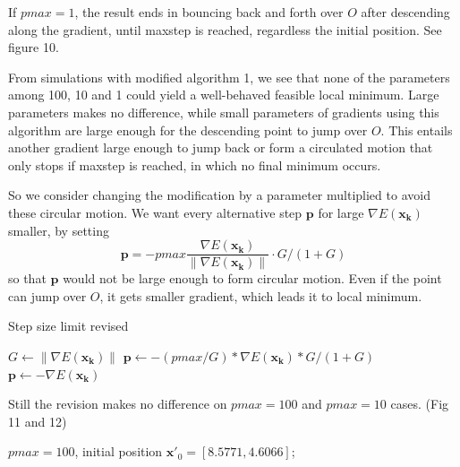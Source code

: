 \documentclass{article}
\begin{document}
If $pmax=1$, the result ends in bouncing back and forth over $O$ after descending along the gradient, until maxstep is reached, regardless the initial position. See figure 10.

\vspace{3mm}
From simulations with modified algorithm 1, we see that none of the parameters among 100, 10 and 1 could yield a well-behaved feasible local minimum. Large parameters makes no difference, while small parameters of gradients using this algorithm are large enough for the descending point to jump over $O$. This entails another gradient large enough to jump back or form a circulated motion that only stops if maxstep is reached, in which no final minimum occurs. 

So we consider changing the modification by a parameter multiplied to avoid these circular motion. We want every alternative step $\mathbf{p}$ for large $\nabla E(\mathbf{x_k})$ smaller, by setting 
$$\mathbf{p} = -pmax\frac{\nabla E(\mathbf{x_k})}{\|\nabla E(\mathbf{x_k})\|}\cdot G/(1+G)$$
so that $\mathbf{p}$ would not be large enough to form circular motion. Even if the point can jump over $O$, it gets smaller gradient, which leads it to local minimum.
\begin{algorithm}
\caption{Step size limit revised}\label{euclid}
\begin{algorithmic}[2]
\State $G \gets \|{\nabla E(\mathbf{x_k})}\| $
\State $\mathbf{p} \gets -(pmax/G) * \nabla E(\mathbf{x_k}) * G/(1+G)$
\Else ~$\mathbf{p} \gets -\nabla E(\mathbf{x_k}) $
\EndIf
\end{algorithmic}
\end{algorithm}

\noindent
Still the revision makes no difference on $pmax = 100$ and $pmax = 10$ cases. (Fig 11 and 12)

$pmax=100$, initial position $\mathbf{x}'_{0} = [8.5771,4.6066]$;
\end{document}

